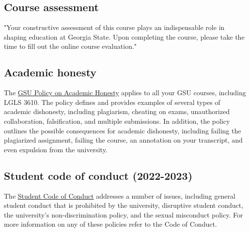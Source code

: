 \documentclass{article}
\begin{document}
\subsection{Course assessment}
"Your constructive assessment of this course plays an indispensable role in shaping education at Georgia State.  Upon completing the course, please take the time to fill out the online course evaluation."

\subsection{Academic honesty}
The \href{https://provost.gsu.edu/document/academic-honesty-policy/}{GSU Policy on Academic Honesty} applies to all your GSU courses, including LGLS 3610.  The policy defines and provides examples of several types of academic dishonesty, including plagiarism, cheating on exams, unauthorized collaboration, falsification, and multiple submissions.  In addition, the policy outlines the possible consequences for academic dishonesty, including failing the plagiarized assignment, failing the course, an annotation on your transcript, and even expulsion from the 
university.

\subsection{Student code of conduct (2022-2023)}
The \href{https://codeofconduct.gsu.edu/}{Student Code of Conduct} addresses a number of issues, including general student conduct that is prohibited by the university, disruptive student conduct, the university's non-discrimination policy, and the sexual misconduct policy.  For more information on any of these policies refer to the Code of Conduct.
\end{document}
